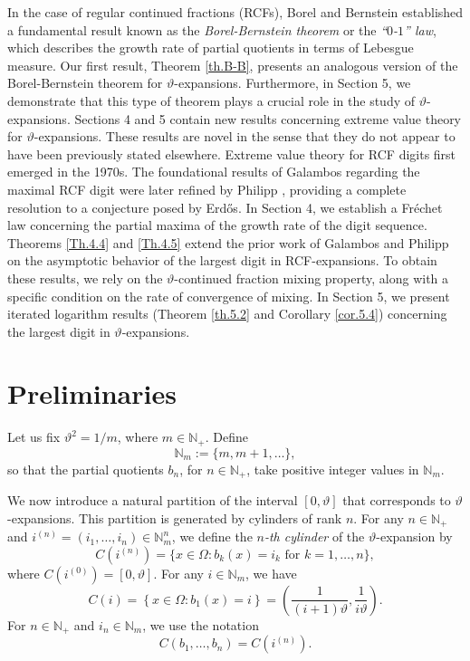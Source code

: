 \documentclass[final,1p,times]{elsarticle}
\numberwithin{equation}{section}
\begin{document}
In the case of regular continued fractions (RCFs), Borel \cite{Borel} and Bernstein \cite{Bern} established a fundamental result known as the \textit{Borel-Bernstein theorem} or the \textit{``$0$-$1$'' law}, which describes the growth rate of partial quotients in terms of Lebesgue measure.  
Our first result, Theorem \ref{th.B-B}, presents an analogous version of the Borel-Bernstein theorem for $\vartheta$-expansions.  
Furthermore, in Section 5, we demonstrate that this type of theorem plays a crucial role in the study of $\vartheta$-expansions.  
Sections 4 and 5 contain new results concerning extreme value theory for $\vartheta$-expansions. These results are novel in the sense that they do not appear to have been previously stated elsewhere.  
Extreme value theory for RCF digits first emerged in the 1970s. The foundational results of Galambos \cite{G-1972, G-1973, G-1974} regarding the maximal RCF digit were later refined by Philipp \cite{Ph-1976}, providing a complete resolution to a conjecture posed by Erd\H{o}s.   In Section 4, we establish a Fr\'echet law concerning the partial maxima of the growth rate of the digit sequence.  
Theorems \ref{Th.4.4} and \ref{Th.4.5} extend the prior work of Galambos \cite{G-1972} and Philipp \cite{Ph-1976} on the asymptotic behavior of the largest digit in RCF-expansions.  To obtain these results, we rely on the $\vartheta$-continued fraction mixing property, along with a specific condition on the rate of convergence of mixing.  
In Section 5, we present iterated logarithm results (Theorem \ref{th.5.2} and Corollary \ref{cor.5.4}) concerning the largest digit in $\vartheta$-expansions.  

\section{Preliminaries} 

Let us fix $\vartheta^2 = 1/m$, where $m \in \mathbb{N}_+$. Define  
\[
\mathbb{N}_m := \{m, m+1, \ldots\},
\]
so that the partial quotients $b_n$, for $n \in \mathbb{N}_+$, take positive integer values in $\mathbb{N}_m$.  

We now introduce a natural partition of the interval $[0, \vartheta]$ that corresponds to $\vartheta$-expansions. This partition is generated by cylinders of rank $n$. For any $n \in \mathbb{N}_+$ and  
$i^{(n)}=(i_1, \ldots, i_n) \in \mathbb{N}_m^n$, we define the {\it $n$-th cylinder} of the $\vartheta$-expansion by  
%
\begin{equation*}
C \left(i^{(n)}\right) = \{x \in \Omega:  b_k(x) = i_k \text{ for } k=1, \ldots, n \},
\end{equation*}
%
where $C \left(i^{(0)}\right) = [0, \vartheta]$.  
For any $i \in \mathbb{N}_m$, we have  
%
\begin{equation} \label{2.01}
C(i) = \left\{x \in \Omega: b_1(x) = i \right\} = \left( \frac{1}{(i+1)\vartheta}, \frac{1}{i \vartheta} \right).
\end{equation}
%
For $n \in \mathbb{N}_+$ and $i_n \in \mathbb{N}_m$, we use the notation  
\[
C(b_1, \ldots, b_n) = C \left(i^{(n)}\right).
\]  
\end{document}
